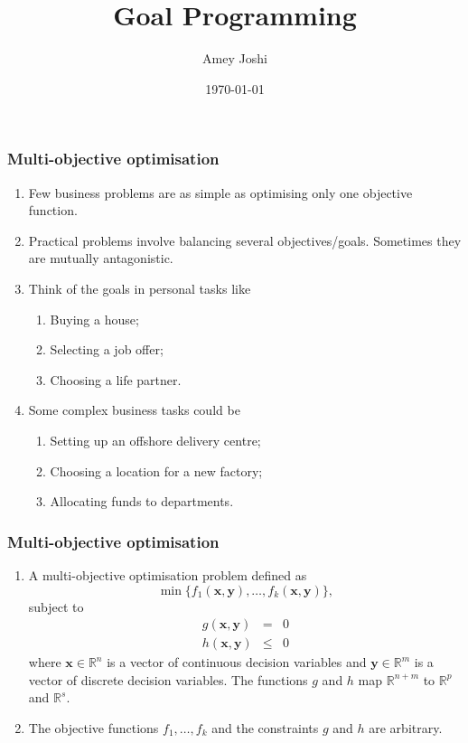 \documentclass{beamer}
\title{Goal Programming}
\author{Amey Joshi}
\date{\today}
\begin{document}
\begin{frame}
\titlepage
\end{frame}

\begin{frame}
\frametitle{Multi-objective optimisation}
\begin{enumerate}
\item Few business problems are as simple as optimising only one objective 
function.
\item Practical problems involve balancing several objectives/goals. Sometimes
they are mutually antagonistic.
\item Think of the goals in personal tasks like
\begin{enumerate}
\item Buying a house;
\item Selecting a job offer;
\item Choosing a life partner.
\end{enumerate}
\item Some complex business tasks could be 
\begin{enumerate}
\item Setting up an offshore delivery centre;
\item Choosing a location for a new factory;
\item Allocating funds to departments.
\end{enumerate}
\end{enumerate}
\end{frame}

\begin{frame}
\frametitle{Multi-objective optimisation}
\begin{enumerate}
\item A multi-objective optimisation problem defined as 
\begin{equation}\label{e1}
\min\{f_1(\bm{x}, \bm{y}), \ldots, f_k(\bm{x}, \bm{y})\},
\end{equation}
subject to
\begin{eqnarray}
g(\bm{x}, \bm{y}) &=& 0 \label{e2} \\
h(\bm{x}, \bm{y}) &\le& 0 \label{e3}
\end{eqnarray}
where $\bm{x} \in \mathbb{R}^n$ is a vector of continuous decision variables and
$\bm{y} \in \mathbb{R}^m$ is a vector of discrete decision variables. The functions
$g$ and $h$ map $\mathbb{R}^{n+m}$ to $\mathbb{R}^p$ and $\mathbb{R}^s$.
\item The objective functions $f_1, \ldots, f_k$ and the constraints $g$ and 
$h$ are arbitrary.
\end{enumerate}
\end{frame}
\end{document}

